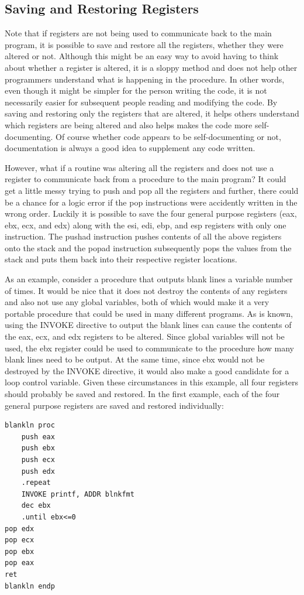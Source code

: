 \documentclass[10pt]{book}
\begin{document}
\subsection{Saving and Restoring Registers}
Note that if registers are not being used to communicate back to the main program, it is possible to save and restore all the registers, whether they were altered or not. Although this might be an easy way to avoid having to think about whether a register is altered, it is a sloppy method and does not help other programmers understand what is happening in the procedure. In other words, even though it might be simpler for the person writing the code, it is not necessarily easier for subsequent people reading and modifying the code. By saving and restoring only the registers that are altered, it helps others understand which registers are being altered and also helps makes the code more self-documenting. Of course whether code appears to be self-documenting or not, documentation is always a good idea to supplement any code written.

However, what if a routine was altering all the registers and does not use a register to communicate back from a procedure to the main program? It could get a little messy trying to push and pop all the registers and further, there could be a chance for a logic error if the pop instructions were accidently written in the wrong order. Luckily it is possible to save the four general purpose registers (eax, ebx, ecx, and edx) along with the esi, edi, ebp, and esp registers with only one instruction. The pushad instruction pushes contents of all the above registers onto the stack and the popad instruction subsequently pops the values from the stack and puts them back into their respective register locations.

As an example, consider a procedure that outputs blank lines a variable number of times. It would be nice that it does not destroy the contents of any registers and also not use any global variables, both of which would make it a very portable procedure that could be used in many different programs. As is known, using the INVOKE directive to output the blank lines can cause the contents of the eax, ecx, and edx registers to be altered. Since global variables will not be used, the ebx register could be used to communicate to the procedure how many blank lines need to be output. At the same time, since ebx would not be destroyed by the INVOKE directive, it would also make a good candidate for a loop control variable. Given these circumstances in this example, all four registers should probably be saved and restored. In the first example, each of the four general purpose registers are saved and restored individually:
\begin{verbatim}
blankln proc
    push eax
    push ebx
    push ecx
    push edx
    .repeat
    INVOKE printf, ADDR blnkfmt
    dec ebx
    .until ebx<=0
pop edx
pop ecx
pop ebx
pop eax
ret
blankln endp
\end{verbatim}
\end{document}
